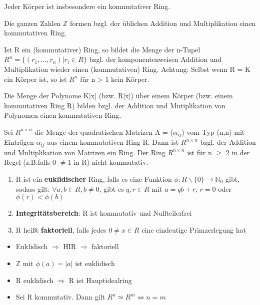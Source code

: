 \begin{example}
\leavevmode
\begin{compactenum}
\item Jeder Körper ist insbesondere ein kommutativer Ring.
\item Die ganzen Zahlen $\mathbb{Z}$ formen bzgl. der üblichen Addition und Multiplikation einen kommutativen Ring.
\item Ist R ein (kommutativer) Ring, so bildet die Menge der n-Tupel $R^n = \{(r_1,..., r_n) | r_i \in R\}$ bzgl. der komponentenweisen Addition und Multiplikation wieder einen (kommutativen) Ring. Achtung: Selbst wenn R = K ein Körper ist, so ist $R^n$ für n > 1 kein Körper.
\item Die Menge der Polynome K[x] (bzw. R[x]) über einem Körper (bzw. einem kommutativen Ring R) bilden bzgl. der Addition und Mutiplikation von Polynomen einen kommutativen Ring.
\item Sei $R^{n \times n}$ die Menge der quadratischen Matrizen A = ($\alpha_{ij}$) vom Typ (n,n) mit Einträgen $\alpha_{ij}$ aus einem kommutativen Ring R. Dann ist $R^{n \times n}$ bzgl. der Addition und Multiplikation von Matrizen ein Ring. Der Ring $R^{n \times n}$ ist für n $\ge$ 2 in der Regel (z.B.falls 0 $\neq$1 in R) nicht kommutativ.
\end{compactenum}
\end{example}

\begin{definition}
\leavevmode
\begin{enumerate}
	\item R ist ein \textbf{euklidischer} Ring, falls es eine Funktion $\phi : R\backslash \{0\} \rightarrow \mathbb{N}_0$ gibt, sodass gilt:
	$\forall a,b \in R, b \neq 0$, gibt es $q,r \in R$ mit $a=qb+r$, $r=0$ oder $\phi(r) < \phi (b)$
	\item \textbf{Integritätsbereich}: R ist kommutativ und Nullteilerfrei
	\item R heißt \textbf{faktoriell}, falls jedes $0 \neq x \in R$ eine eindeutige Primzerlegung hat
\end{enumerate}
\end{definition}

\begin{remark}
\leavevmode
\begin{itemize}
	\item Euklidisch $\Rightarrow$ HIR $\Rightarrow$ faktoriell
	\item $\mathbb{Z}$ mit $\phi(a) = |a|$ ist euklidisch
	\item R euklidisch $\Rightarrow$ R ist Hauptidealring
	\item Sei R kommutativ. Dann gilt $R^n \simeq R^m \Leftrightarrow n=m$
\end{itemize}
\end{remark}

